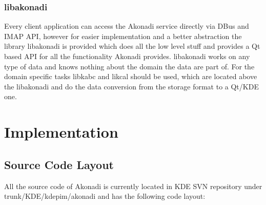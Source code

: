 \documentclass[]{report}
\begin{document}
\subsection{libakonadi}
Every client application can access the Akonadi service directly via DBus and IMAP API, however
for easier implementation and a better abstraction the library libakonadi is provided which does
all the low level stuff and provides a Qt based API for all the functionality Akonadi provides.
libakonadi works on any type of data and knows nothing about the domain the data are part of.
For the domain specific tasks libkabc and likcal should be used, which are located above the
libakonadi and do the data conversion from the storage format to a Qt/KDE one.

\chapter{Implementation}

\section{Source Code Layout}
All the source code of Akonadi is currently located in KDE SVN repository under
trunk/KDE/kdepim/akonadi and has the following code layout:
\end{document}
